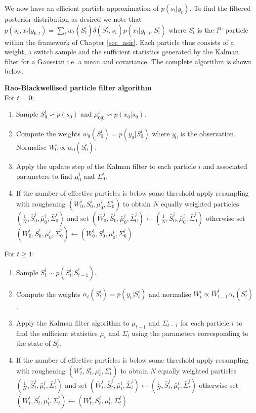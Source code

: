 We now have an efficient particle approximation of $p(s_t|y_t)$. To find the filtered posterior distribution as desired we note that $p(s_t,x_t|y_{0:t}) = \sum_i w_t(S_t^i)\delta(S_t^i, s_t)p(x_t|y_{0:t}, S_t^i)$ where $S_t^i$ is the i$^{\text{th}}$ particle within the framework of Chapter \ref{sec_asir}. Each particle thus consists of a weight, a switch sample and the sufficient statistics generated by the Kalman filter for a Gaussian i.e. a mean and covariance. The complete algorithm is shown below.

\textbf{Rao-Blackwellised particle filter algorithm}\\
For $t=0$:
\begin{enumerate}
\item
Sample $S^i_0 \backsim p(s_0)$ and $\mu_{0|0}^i \backsim p(x_0|s_0)$.
\item
Compute the weights $w_0(S_0^i) = p(y_0|S_0^i)$ where $y_0$ is the observation. Normalise $W^i_0 \propto w_0(S^i_0)$.
\item
Apply the update step of the Kalman filter to each particle $i$ and associated parameters to find $\mu_0^i$ and $\Sigma_0^i$. 
\item
If the number of effective particles is below some threshold apply resampling with roughening $(W^i_0, {S}^i_0,{\mu}^i_0, {\Sigma}^i_0)$ to obtain $N$ equally weighted particles $(\frac{1}{N}, \bar{S}^i_0, \bar{\mu}^i_0, \bar{\Sigma}^i_0)$ and set $(\bar{W}^i_0, \bar{S}^i_0, \bar{\mu}^i_0, \bar{\Sigma}^i_0) \leftarrow (\frac{1}{N}, \bar{S}^i_0, \bar{\mu}^i_0, \bar{\Sigma}^i_0)$ otherwise set $(\bar{W}^i_0, \bar{S}^i_0, \bar{\mu}^i_0, \bar{\Sigma}^i_0) \leftarrow ({W}^i_0, {S}^i_0, \mu^i_0, \Sigma_0^i)$
\end{enumerate}
For $t \geq 1$:
\begin{enumerate}
\item
Sample $S^i_t \backsim p(S_t^i|\bar{S}^i_{t-1})$.
\item
Compute the weights $\alpha_t(S^i_{t}) = p(y_t|S_t^i)$ and normalise $W^i_t \propto \bar{W}^i_{t-1}\alpha_t(S^i_{t})$.
\item
Apply the Kalman filter algorithm to $\mu_{t-1}$ and $\Sigma_{t-1}$ for each particle $i$ to find the sufficient statistics $\mu_{t}$ and $\Sigma_{t}$ using the parameters corresponding to the state of $S^i_t$.
\item
If the number of effective particles is below some threshold apply resampling with roughening $(W^i_t, {S}^i_t,{\mu}^i_t, {\Sigma}^i_t)$ to obtain $N$ equally weighted particles $(\frac{1}{N}, \bar{S}^i_t, \bar{\mu}^i_t, \bar{\Sigma}^i_t)$ and set $(\bar{W}^i_t, \bar{S}^i_t, \bar{\mu}^i_t, \bar{\Sigma}^i_t) \leftarrow (\frac{1}{N}, \bar{S}^i_t, \bar{\mu}^i_t, \bar{\Sigma}^i_t)$ otherwise set $(\bar{W}^i_t, \bar{S}^i_t, \bar{\mu}^i_t, \bar{\Sigma}^i_t) \leftarrow ({W}^i_t, {S}^i_t, \mu^i_t, \Sigma_t^i)$
\end{enumerate} 

